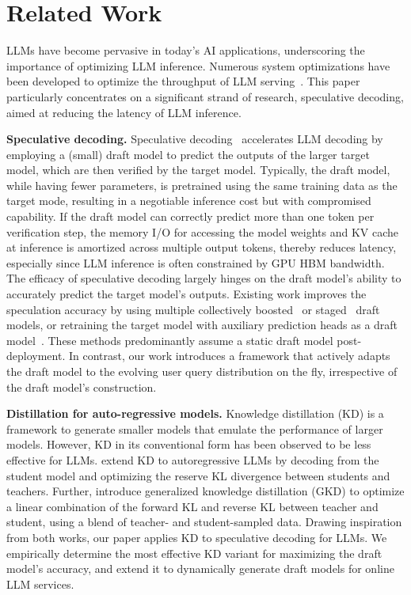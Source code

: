 \section{Related Work}
LLMs have become pervasive in today's AI applications, underscoring the importance of optimizing LLM inference. 
Numerous system optimizations have been developed to optimize the throughput of LLM serving~\citep{yu2022orca,kwon2023efficient}. This paper particularly concentrates on a significant strand of research, speculative decoding, aimed at reducing the latency of LLM inference.

\noindent \textbf{Speculative decoding.}
Speculative decoding~\citep{leviathan2023fast,chen2023accelerating} accelerates LLM decoding by employing a (small) draft model to predict the outputs of the larger target model, which are then verified by the target model. Typically, the draft model, while having fewer parameters, is pretrained using the same training data as the target mode, resulting in a negotiable inference cost but with compromised capability. 
If the draft model can correctly predict more than one token per verification step, the memory I/O for accessing the model weights and KV cache at inference is amortized across multiple output tokens, thereby reduces latency, especially since LLM inference is often constrained by GPU HBM bandwidth.
The efficacy of speculative decoding largely hinges on the draft model's ability to accurately predict the target model's outputs. Existing work improves the speculation accuracy by using multiple collectively boosted~\citep{miao2023specinfer} or staged~\citep{spector2023accelerating} draft models, or retraining the target model with auxiliary prediction heads as a draft model~\citep{medusa, stern2018blockwise}. These methods predominantly assume a static draft model post-deployment. In contrast, our work introduces a framework that actively adapts the draft model to the evolving user query distribution on the fly, irrespective of the draft model's construction.

\noindent \textbf{Distillation for auto-regressive models.}
Knowledge distillation (KD) is a framework to generate smaller models that emulate the performance of larger models. However, KD in its conventional form has been observed to be less effective for LLMs. \cite{gu2023knowledge} extend KD to autoregressive LLMs by decoding from the student model and optimizing the reserve KL divergence between students and teachers.
Further, \cite{agarwal2023gkd} introduce generalized knowledge distillation (GKD) to optimize a linear combination of the forward KL and reverse KL between teacher and student, using a blend of teacher- and student-sampled data. 
Drawing inspiration from both works, our paper applies KD to speculative decoding for LLMs. We empirically determine the most effective KD variant for maximizing the draft model's accuracy, and extend it to dynamically generate draft models for online LLM services.

